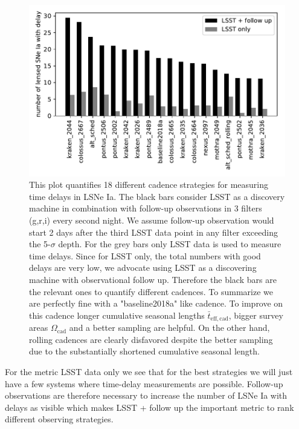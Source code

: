 %
\begin{figure}[h!]
\centering
\includegraphics[scale=1]{sl_MetricLSST.pdf}
\caption{This plot quantifies 18 different cadence strategies for measuring time delays in LSNe Ia. The black bars consider LSST as a discovery machine in combination with follow-up observations in 3 filters (g,r,i) every second night. We assume follow-up observation would start 2 days after the third LSST data point in any filter exceeding the 5-$\sigma$ depth. For the grey bars only LSST data is used to measure time delays. Since for LSST only, the total numbers with good delays are very low, we advocate using LSST as a discovering machine with observational follow up. Therefore the black bars are the relevant ones to quantify different cadences. To summarize we are perfectly fine with a "baseline2018a" like cadence. To improve on this cadence longer cumulative seasonal lengths $\bar{t}_\mathrm{eff,cad}$, bigger survey areas $\Omega_\mathrm{cad}$ and a better sampling are helpful. On the other hand, rolling cadences are clearly disfavored despite the better sampling due to the substantially shortened cumulative seasonal length. }
\label{fig:final results}
\end{figure}

For the metric LSST data only we see that for the best strategies we will just have
a few systems where time-delay measurements are possible. Follow-up observations are therefore necessary to
increase the number of LSNe Ia with delays as visible which makes LSST + follow up the important metric to rank different observing strategies.

